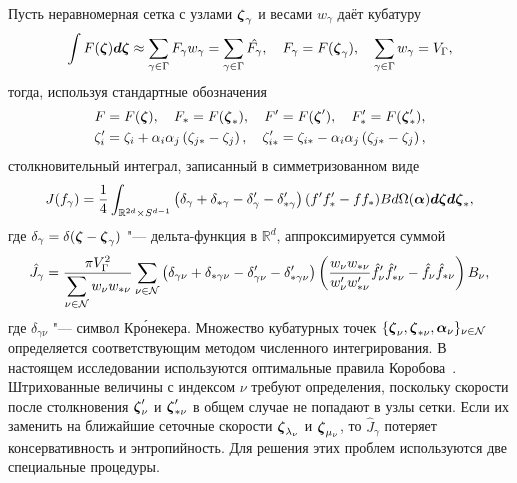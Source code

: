 Пусть неравномерная сетка с узлами \({\boldsymbol{\zeta}}_\gamma\) и весами \(w_\gamma\) даёт кубатуру
\begin{equation*}
    \int F({\boldsymbol{\zeta}}) \boldsymbol{d\zeta} \approx \sum_{\gamma\in\Gamma} F_\gamma w_\gamma =
        \sum_{\gamma\in\Gamma} \hat{F_\gamma},
    \quad F_\gamma = F({\boldsymbol{\zeta}}_\gamma),
    \quad \sum_{\gamma\in\Gamma} w_\gamma = V_\Gamma,
\end{equation*}
тогда, используя стандартные обозначения
\begin{gather*}
    F=F({\boldsymbol{\zeta}}), \quad F_*=F({\boldsymbol{\zeta}}_*), \quad F'=F({\boldsymbol{\zeta}}'), \quad F'_*=F({\boldsymbol{\zeta}}'_*), \\
    \zeta_i' = \zeta_i+\alpha_i\alpha_j \left(\zeta_{j*}-\zeta_j\right), \quad
    \zeta_{i*}' = \zeta_{i*}-\alpha_i\alpha_j \left(\zeta_{j*}-\zeta_j\right),
\end{gather*}
столкновительный интеграл, записанный в симметризованном виде
\begin{equation*}
    J(f_\gamma) = \frac14\int_{\mathbb{R}^{2d}\times S^{d-1}} \left(
        \delta_\gamma + \delta_{*\gamma} - \delta'_\gamma - \delta'_{*\gamma}
    \right) (f'f'_* - ff_*)B d\Omega(\boldsymbol{\alpha}) \boldsymbol{d\zeta}\boldsymbol{d\zeta}_*,
\end{equation*}
где \(\delta_\gamma = \delta({\boldsymbol{\zeta}}-{\boldsymbol{\zeta}}_\gamma)\) "--- дельта-функция в \(\mathbb{R}^d\),
аппроксимируется суммой
\begin{equation*}
    \hat{J}_\gamma = \frac{\pi V_\Gamma^2}{\displaystyle\sum_{\nu\in\mathcal{N}} w_{\nu}w_{*\nu}}
        \sum_{\nu\in\mathcal{N}} \left(
            \delta_{\gamma\nu} + \delta_{*\gamma\nu} - \delta'_{\gamma\nu} - \delta'_{*\gamma\nu}
        \right)\left(
            \frac{w_{\nu}w_{*\nu}}{w'_{\nu}w'_{*\nu}}
            \hat{f}'_{\nu}\hat{f}'_{*\nu} - \hat{f}_{\nu}\hat{f}_{*\nu}
        \right)B_\nu,
\end{equation*}
где \(\delta_{\gamma\nu}\) "--- символ Кр\'{о}некера.
Множество кубатурных точек \(\{{\boldsymbol{\zeta}}_\nu, {\boldsymbol{\zeta}}_{*\nu}, \boldsymbol{\alpha}_\nu\}_{\nu\in\mathcal{N}}\) определяется
соответствующим методом численного интегрирования.
В настоящем исследовании используются оптимальные правила Коробова~\autocite{Korobov1963}.
Штрихованные величины с индексом \(\nu\) требуют определения,
поскольку скорости после столкновения \({\boldsymbol{\zeta}}'_\nu\) и \({\boldsymbol{\zeta}}'_{*\nu}\) в общем случае не попадают в узлы сетки.
Если их заменить на ближайшие сеточные скорости \({\boldsymbol{\zeta}}_{\lambda_\nu}\) и \({\boldsymbol{\zeta}}_{\mu_\nu}\),
то \(\hat{J}_\gamma\) потеряет консервативность и энтропийность.
Для решения этих проблем используются две специальные процедуры.

